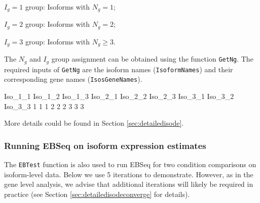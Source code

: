 \documentclass{article}
\begin{document}
$I_g=1$ group: Isoforms with $N_g=1$;

$I_g=2$ group: Isoforms with $N_g=2$;

$I_g=3$ group: Isoforms with $N_g \geq 3$.

The $N_g$ and $I_g$ group assignment can be obtained using the function \verb+GetNg+. 
The required inputs of \verb+GetNg+ are the isoform names (\verb+IsoformNames+) and 
their corresponding gene names (\verb+IsosGeneNames+).
\begin{Schunk}
\begin{Soutput}
Iso_1_1 Iso_1_2 Iso_1_3 Iso_2_1 Iso_2_2 Iso_2_3 Iso_3_1 Iso_3_2 Iso_3_3 
      1       1       1       2       2       2       3       3       3 
\end{Soutput}
\end{Schunk}
More details could be found in Section \ref{sec:detailedisode}.

\subsubsection{Running EBSeq on isoform expression estimates}
\label{sec:startisoderun}
The \verb+EBTest+ function is also used to run EBSeq for two condition comparisons 
on isoform-level data. 
Below we use 5 iterations to demonstrate.  However, as
in the gene level analysis, we advise that additional iterations will likely be 
required in practice (see Section \ref{sec:detailedisodeconverge} for details). 
\end{document}
